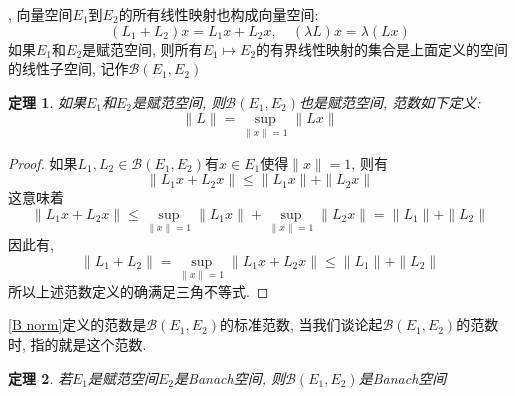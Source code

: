 \documentclass[a4paper,11pt]{article}
\newtheorem{theorem}{\hspace{2em}定理}[section]
\newtheorem{proof}{证明}[section]
\begin{document}
, 向量空间$E_1$到$E_2$的所有线性映射也构成向量空间:
\begin{equation*}
  (L_1+L_2)x=L_1x+L_2x,\quad (\lambda L)x=\lambda(Lx)
\end{equation*}
如果$E_1$和$E_2$是赋范空间, 则所有$E_1\mapsto E_2$的有界线性映射的集合是上面定义的空间的线性子空间, 记作$\mathcal{B}(E_1,E_2)$
\begin{theorem}
  如果$E_1$和$E_2$是赋范空间, 则$\mathcal{B}(E_1,E_2)$也是赋范空间, 范数如下定义:
  \begin{equation*}\label{B norm}
    \|L\|=\sup_{\|x\|=1}\|Lx\|
  \end{equation*}
\end{theorem}
\begin{proof}
  如果$L_1,L_2\in\mathcal{B}(E_1,E_2)$有$x\in E_1$使得$\|x\|=1$, 则有
  \begin{equation*}
    \|L_1x+L_2x\|\leq\|L_1x\|+\|L_2x\|
  \end{equation*}
  这意味着
  \begin{equation*}
    \|L_1x+L_2x\|\leq\sup_{\|x\|=1}\|L_1x\|+\sup_{\|x\|=1}\|L_2x\|=\|L_1\|+\|L_2\|
  \end{equation*}
  因此有,
  \begin{equation*}
    \|L_1+L_2\|=\sup_{\|x\|=1}\|L_1x+L_2x\|\leq\|L_1\|+\|L_2\|
  \end{equation*}
  所以上述范数定义的确满足三角不等式.
\end{proof}
\eqref{B norm}定义的范数是$\mathcal{B}(E_1,E_2)$的标准范数, 当我们谈论起$\mathcal{B}(E_1,E_2)$的范数时, 指的就是这个范数.
\begin{theorem}
  若$E_1$是赋范空间$E_2$是Banach空间, 则$\mathcal{B}(E_1,E_2)$是Banach空间
\end{theorem}
\end{document}
